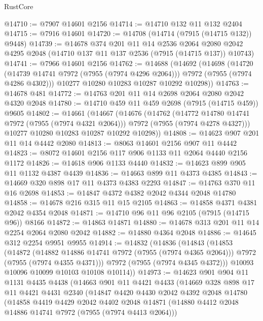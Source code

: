 \begin{lexlean}{RustCore}
\begin{coremodule}
@14710 := @7907 @14601 @2156
@14714 := @14710 @132 @11 @132 @2404
@14715 := @7916 @14601
@14720 := @14708 (@14714 (@7915 (@14715 @132)) @9448)
@14739 := @14678
    @374
    @201
    @11
    @14
    @2536
    @2064
    @2080
    @2042
    @4295
    @2048
    (@14710 @137 @11 @137 @2536 (@7915 (@14715 @137)) @10743)
@14741 := @7966 @14601 @2156
@14762 := @14688
    (@14692
      (@14698
        (@14720 (@14739 @14741 @7972 (@7955 (@7974 @4296 @2064))) @7972 (@7955 (@7974 @4286 @4302)))
        @10277
        @10280
        @10283
        @10287
        @10292
        @10298))
@14763 := @14678 @481
@14772 := @14763 @201 @11 @14 @2698 @2064 @2080 @2042 @4320 @2048
@14780 := @14710 @459 @11 @459 @2698 (@7915 (@14715 @459)) @9605
@14802 := @14661
    (@14667
      (@14676
        (@14762
          (@14772 @14780 @14741 @7972 (@7955 (@7974 @4321 @2064)))
          @7972
          (@7955 (@7974 @4278 @4327)))
        @10277
        @10280
        @10283
        @10287
        @10292
        @10298))
@14808 := @14623 @907 @201 @11 @14 @4442 @2080
@14813 := @8063 @14601 @2156 @907 @11 @4442
@14823 := @8072 @14601 @2156 @117 @906 @1133 @11 @2064 @4440 @2156 @1172
@14826 := @14618 @906 @1133 @4440
@14832 := @14623 @899 @905 @11 @1132 @4387 @4439
@14836 := @14663 @899 @11 @4373 @4385
@14843 := @14669 @320 @898 @17 @11 @4373 @4383 @2293
@14847 := @14763 @370 @11 @16 @2698
@14853 := @14847 @4372 @4382 @2042 @4344 @2048 @14780
@14858 := @14678 @216 @315 @11 @15 @2105
@14863 := @14858 @4371 @4381 @2042 @4354 @2048
@14871 := @14710 @96 @11 @96 @2105 (@7915 (@14715 @96)) @8166
@14872 := @14863 @14871
@14880 := @14678 @313 @201 @11 @14 @2254 @2064 @2080 @2042
@14882 := @14880 @4364 @2048
@14886 := @14645 @312 @2254 @9951 @9955
@14914 := @14832
    (@14836
      (@14843
        (@14853
          (@14872
            (@14882 @14886 @14741 @7972 (@7955 (@7974 @4365 @2064)))
            @7972
            (@7955 (@7974 @4355 @4371)))
          @7972
          (@7955 (@7974 @4345 @4372)))
        @10093
        @10096
        @10099
        @10103
        @10108
        @10114))
@14973 := @14623
    @901
    @904
    @11
    @1131
    @4435
    @4438
    (@14663
      @901
      @11
      @4421
      @4433
      (@14669
        @328
        @898
        @17
        @11
        @4421
        @4431
        @2340
        (@14847
          @4420
          @4430
          @2042
          @4392
          @2048
          @14780
          (@14858
            @4419
            @4429
            @2042
            @4402
            @2048
            @14871
            (@14880 @4412 @2048 @14886 @14741 @7972 (@7955 (@7974 @4413 @2064)))

\end{coremodule}
\end{lexlean}
